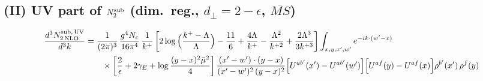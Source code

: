 \documentclass[10pt]{article}
\begin{document}
\subsection*{(II) UV part of $N_{2}^{\rm sub}$ (dim.\ reg., $d_{\perp}=2-\epsilon$, $\overline{MS}$)}
\begin{align}
\frac{d^{3}N^{\rm sub,\,UV}_{2\,\rm NLO}}{d^{3}k}&=\frac{1}{(2\pi)^{3}}\,\frac{g^{4}N_{c}}{16\pi^{4}}\,\frac{1}{k^{+}}\left[2\log\Big(\frac{k^{+}-\Lambda}{\Lambda}\Big)-\frac{11}{6}+\frac{4\Lambda}{k^{+}}-\frac{\Lambda^{2}}{k^{+2}}+\frac{2\Lambda^{3}}{3k^{+3}}\right]\int_{x,y,x',w'}e^{-ik\cdot(w'-x)}\notag\\&\qquad\times\left[\frac{2}{\epsilon}+2\gamma_{E}+\log\frac{(y-x)^{2}\bar\mu^{2}}{4}\right]\frac{(x'-w')\cdot(y-x)}{(x'-w')^{2}\,(y-x)^{2}}\Big[U^{ab'}(x')-U^{ab'}(w')\Big]\Big[U^{af}(y)-U^{af}(x)\Big]\rho^{b'}(x')\,\rho^{f}(y)
\end{align}
\end{document}
